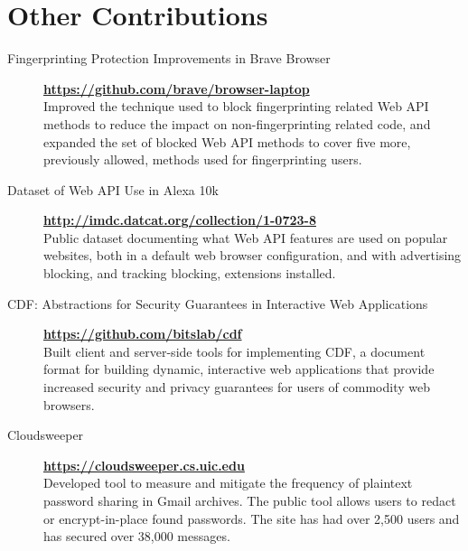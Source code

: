 \documentclass{vitae}
\begin{document}
  \section{Other Contributions}
  \begin{description}

      \item[Fingerprinting Protection Improvements in Brave Browser] \hfill \textbf{\url{https://github.com/brave/browser-laptop}}\\
    Improved the technique used to block fingerprinting related Web API methods
    to reduce the impact on non-fingerprinting related code, and expanded the set
    of blocked Web API methods to cover five more, previously allowed, methods used for fingerprinting users.

\item[Dataset of Web API Use in Alexa 10k] \hfill \textbf{\url{http://imdc.datcat.org/collection/1-0723-8}}\\
    Public dataset documenting what Web API features are used
    on popular websites, both in a default web browser configuration, and with
    advertising blocking, and tracking blocking, extensions installed.

\item[CDF: Abstractions for Security Guarantees in Interactive Web Applications] \hfill \textbf{\url{https://github.com/bitslab/cdf}}\\
    Built client and server-side tools for implementing CDF, a document format for building dynamic, interactive web applications
    that provide increased security and privacy guarantees for users of commodity web browsers.

\item[Cloudsweeper] \hfill \textbf{\url{https://cloudsweeper.cs.uic.edu}}\\
    Developed tool to measure and mitigate the frequency of plaintext password sharing in Gmail archives. The public
    tool allows users to redact or encrypt-in-place found passwords. The site has had over 2,500 users and has
    secured over 38,000 messages.
  \end{description}
\end{document}

